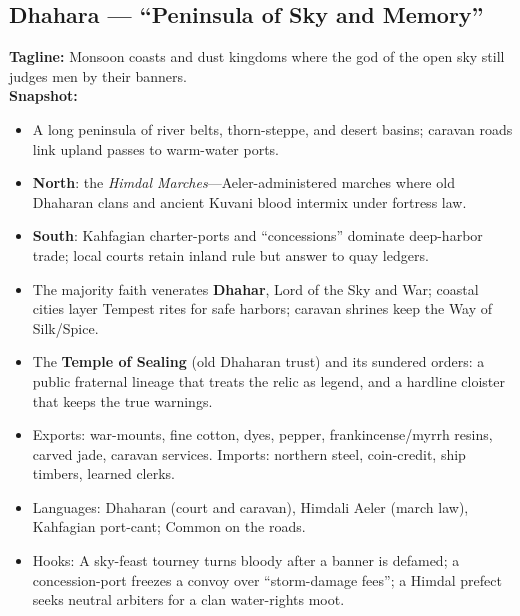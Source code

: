 \documentclass[11pt]{book}
\begin{document}
\subsection*{Dhahara — “Peninsula of Sky and Memory”}
\textbf{Tagline:} Monsoon coasts and dust kingdoms where the god of the open sky still judges men by their banners.\\
\textbf{Snapshot:}
\begin{itemize}
  \item A long peninsula of river belts, thorn-steppe, and desert basins; caravan roads link upland passes to warm-water ports.
  \item \textbf{North}: the \emph{Himdal Marches}—Aeler-administered marches where old Dhaharan clans and ancient Kuvani blood intermix under fortress law. 
  \item \textbf{South}: Kahfagian charter-ports and “concessions” dominate deep-harbor trade; local courts retain inland rule but answer to quay ledgers.
  \item The majority faith venerates \textbf{Dhahar}, Lord of the Sky and War; coastal cities layer Tempest rites for safe harbors; caravan shrines keep the Way of Silk/Spice.
  \item The \textbf{Temple of Sealing} (old Dhaharan trust) and its sundered orders: a public fraternal lineage that treats the relic as legend, and a hardline cloister that keeps the true warnings.
  \item Exports: war-mounts, fine cotton, dyes, pepper, frankincense/myrrh resins, carved jade, caravan services. Imports: northern steel, coin-credit, ship timbers, learned clerks.
  \item Languages: Dhaharan (court and caravan), Himdali Aeler (march law), Kahfagian port-cant; Common on the roads.
  \item Hooks: A sky-feast tourney turns bloody after a banner is defamed; a concession-port freezes a convoy over “storm-damage fees”; a Himdal prefect seeks neutral arbiters for a clan water-rights moot.
\end{itemize}
\end{document}
